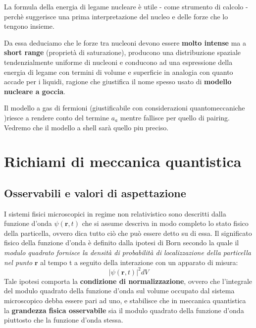 La formula della energia di legame nucleare è utile - come strumento di
calcolo - perchè suggerisce una prima interpretazione del nucleo e delle
forze che lo tengono insieme.

Da essa deduciamo che le forze tra nucleoni devono essere \textbf{molto
	intense} ma a \textbf{short range} (proprietà di saturazione), producono
una distribuzione spaziale tendenzialmente uniforme di nucleoni e
conducono ad una espressione della energia di legame con termini di
volume e superficie in analogia con quanto accade per i liquidi, ragione
che giustifica il nome spesso usato di \textbf{modello nucleare a
	goccia}.

Il modello a gas di fermioni (giustificabile con considerazioni
quantomeccaniche )riesce a rendere conto del termine \(a_{a}\) mentre
fallisce per quello di pairing.
Vedremo che il modello a shell sarà
quello piu preciso.


\section{Richiami di meccanica quantistica}\label{richiami-di-meccanica-quantistica}

\subsection{Osservabili e valori di aspettazione}\label{sec:osservabili-e-valori-di-aspettazione}

I sistemi fisici microscopici in regime non relativistico sono descritti
dalla funzione d'onda \(\psi(\bm{r},t)\) che si assume descriva in modo
completo lo stato fisico della particella, ovvero dica tutto ciò che può
essere detto su di essa.
Il significato fisico della funzione d'onda è
definito dalla ipotesi di Born secondo la quale il \emph{modulo quadrato
	fornisce la densità di probabilità di localizzazione della particella
	nel punto} \(\bm{r}\) al tempo t a seguito della interazione con un
apparato di misura: \[
	| \psi(\bm{r},t)|^{2}dV
\] Tale ipotesi comporta la \textbf{condizione di normalizzazione},
ovvero che l'integrale del modulo quadrato della funzione d'onda sul
volume occupato dal sistema microscopico debba essere pari ad uno, e
stabilisce che in meccanica quantistica la \textbf{grandezza fisica
	osservabile} sia il modulo quadrato della funzione d'onda piuttosto che
la funzione d'onda stessa.

